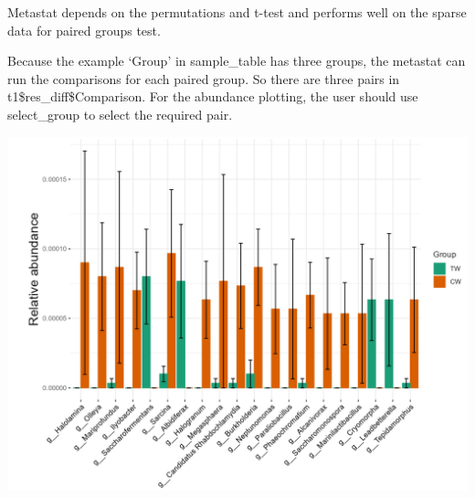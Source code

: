\documentclass[
]{book}
\newenvironment{Shaded}{\begin{snugshade}}{\end{snugshade}}
\newcommand{\AttributeTok}[1]{\textcolor[rgb]{0.77,0.63,0.00}{#1}}
\newcommand{\CommentTok}[1]{\textcolor[rgb]{0.56,0.35,0.01}{\textit{#1}}}
\newcommand{\DecValTok}[1]{\textcolor[rgb]{0.00,0.00,0.81}{#1}}
\newcommand{\FunctionTok}[1]{\textcolor[rgb]{0.00,0.00,0.00}{#1}}
\newcommand{\NormalTok}[1]{#1}
\newcommand{\OtherTok}[1]{\textcolor[rgb]{0.56,0.35,0.01}{#1}}
\newcommand{\SpecialCharTok}[1]{\textcolor[rgb]{0.00,0.00,0.00}{#1}}
\newcommand{\StringTok}[1]{\textcolor[rgb]{0.31,0.60,0.02}{#1}}
\begin{document}
Metastat depends on the permutations and t-test and performs well on the sparse data for paired groups test.

\begin{Shaded}
\end{Shaded}

Because the example `Group' in sample\_table has three groups,
the metastat can run the comparisons for each paired group. So there are three pairs in t1\$res\_diff\$Comparison.
For the abundance plotting, the user should use select\_group to select the required pair.

\begin{Shaded}
\end{Shaded}

\begin{center}\includegraphics[width=650px]{Images/trans_diff_metastat_1} \end{center}
\end{document}
